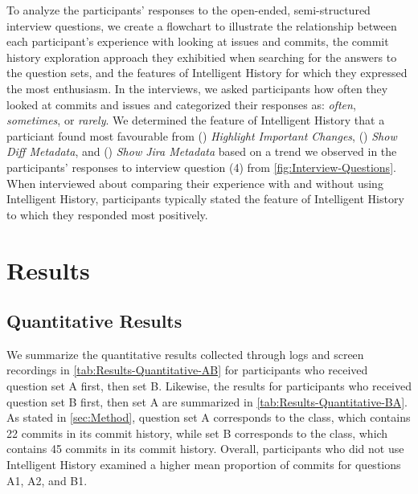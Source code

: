 To analyze the participants' responses to the open-ended, semi-structured interview questions, 
we create a flowchart to illustrate the relationship between each participant's experience with looking at issues and commits,
the commit history exploration approach they exhibitied when searching for the answers to the question sets, 
and the features of Intelligent History for which they expressed the most enthusiasm.
In the interviews, we asked participants how often they looked at commits and issues 
and categorized their responses as: 
\textit{often}, \textit{sometimes}, or \textit{rarely}.
We determined the feature of Intelligent History that a particiant found most favourable from
() \textit{Highlight Important Changes}, 
() \textit{Show Diff Metadata}, and
() \textit{Show Jira Metadata}
based on a trend we observed in the participants' responses to interview question (4) from \autoref{fig:Interview-Questions}.
When interviewed about comparing their experience with and without using Intelligent History,
participants typically stated the feature of Intelligent History to which they responded most positively.

\section{Results}
\label{sec:Results}

\subsection{Quantitative Results}

We summarize the quantitative results collected through logs and screen recordings in \autoref{tab:Results-Quantitative-AB} 
for participants who received question set A first, then set B.
Likewise, the results for participants who received question set B first, then set A are summarized in \autoref{tab:Results-Quantitative-BA}.
As stated in \autoref{sec:Method}, question set A corresponds to the  class, which contains 22 commits in its commit history, 
while set B corresponds to the  class, which contains 45 commits in its commit history.
Overall, participants who did not use Intelligent History examined a higher mean proportion of commits for questions A1, A2, and B1.

